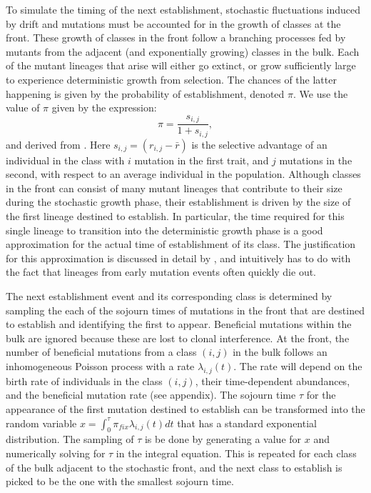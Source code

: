 \documentclass[9pt,twocolumn,twoside]{gsajnl}
\begin{document}
To simulate the timing of the next establishment, stochastic fluctuations induced by drift and mutations must be accounted for in the growth of classes at the front. These growth of classes in the front follow a branching processes fed by mutants from the adjacent (and exponentially growing) classes in the bulk.  Each of the mutant lineages that arise will either go extinct, or grow sufficiently large to experience deterministic growth from selection. The chances of the latter happening is given by the probability of establishment, denoted $\pi$. We use the value of $\pi$ given by the expression:
\begin{equation} \label{eq:2}
\pi = \frac{s_{i,j}}{ 1+s_{i,j}},
\end{equation}and derived from \cite[Equation 16]{desai2007beneficial}. Here $s_{i,j}=(r_{i,j}-\bar{r})$ is the selective advantage of an individual in the class with $i$ mutation in the first trait, and $j$ mutations in the second, with respect to an average individual in the population.  Although classes in the front can consist of many mutant lineages that contribute to their size during the stochastic growth phase, their establishment  is driven by the size of the first lineage destined to establish. In particular, the time required for this single lineage to transition into the deterministic growth phase is a good approximation for the actual time of establishment of its class.  The justification for this approximation is discussed in detail by \cite[p.1773]{desai2007beneficial}, and intuitively has to do with the fact that lineages from early mutation events often quickly die out. \par

The next establishment event and its corresponding class  is determined by sampling the each of the sojourn times of mutations in the front that are destined to establish and identifying the first to appear. Beneficial mutations within the bulk are ignored because these are lost to clonal interference. At the front, the number of beneficial mutations from a class $(i,j)$ in the bulk follows an inhomogeneous Poisson  process with a rate $\lambda_{i,j}(t)$. The rate will depend on the birth rate of individuals in the class $(i,j)$, their time-dependent abundances, and the beneficial mutation rate (see appendix).  The sojourn time $\tau$ for the appearance of the first mutation destined to establish can be transformed into the random variable $x=\int_0^\tau \pi_{fix} \lambda_{i,j}(t) dt$ that has a standard exponential distribution. The sampling of $\tau$ is be done by generating a value for  $x$ and numerically solving for $\tau$ in the integral equation. This is repeated for each class of the bulk adjacent to the stochastic front, and the next class to establish is picked to be the one with the smallest sojourn time. \par
\end{document}
